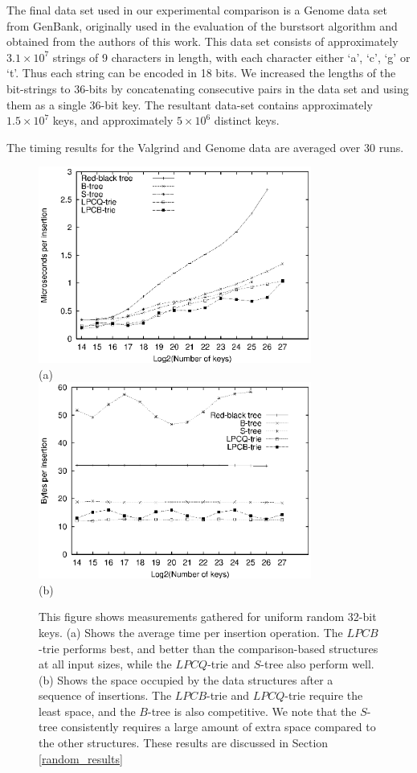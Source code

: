 \documentclass[]{acmtrans2m}
\begin{document}
The final data set used in our experimental comparison is a Genome data set from GenBank, originally used in the evaluation of
the burstsort algorithm \cite{SinhaZobel04} and obtained from the authors of this work.
This data set consists of approximately $3.1 \times 10^7$ strings of 9 characters in length, with
each character either `a', `c', `g' or `t'. Thus each string can be encoded in 18 bits. We increased the lengths of
the bit-strings to 36-bits by concatenating consecutive pairs in the data set and using them as a single 36-bit key.
The resultant data-set contains approximately $1.5 \times 10^7$ keys, and approximately $5 \times 10^6$ distinct keys.

The timing results for the Valgrind and Genome data are averaged over 30 runs.

\begin{figure}
\center
\includegraphics[width=0.8\textwidth]{plots/knuth_irandom_time.eps}\\
(a)\\
\includegraphics[width=0.8\textwidth]{plots/knuth_irandom_mem.eps}\\
(b)
\caption{This figure shows measurements gathered for uniform random 32-bit keys. 
(a) Shows the average time per insertion operation. The $LPCB$-trie performs best, and better than the comparison-based
structures at all input sizes, while the $LPCQ$-trie and $S$-tree also perform well. (b) Shows the space occupied by the data structures after a sequence
of insertions. The $LPCB$-trie and $LPCQ$-trie require the least space, and the $B$-tree is also competitive. We note that the $S$-tree
consistently requires a large amount of extra space compared to the other structures.
These results are discussed in Section \ref{random_results}}
\label{knuth_irandom_time_mem_fig}
\end{figure}
\end{document}
